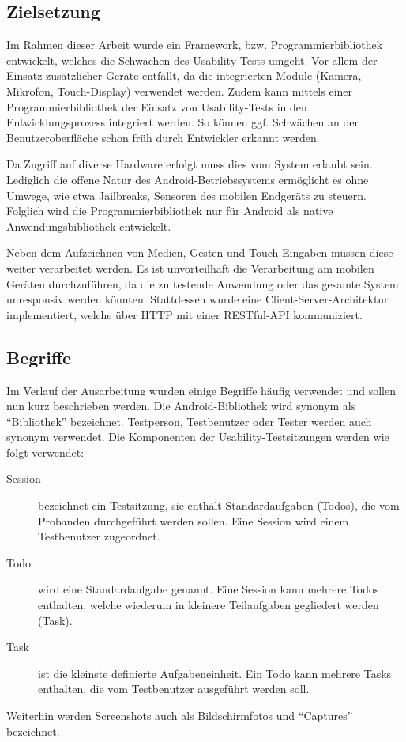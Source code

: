 \subsection{Zielsetzung \label{sec: zielsetzung}}

Im Rahmen dieser Arbeit wurde ein Framework, bzw. Programmierbibliothek entwickelt, welches die Schwächen des Usability-Tests umgeht. 
Vor allem der Einsatz zusätzlicher Geräte entfällt, da die integrierten Module (Kamera, Mikrofon, Touch-Display) verwendet werden. 
Zudem kann mittels einer Programmierbibliothek der Einsatz von Usability-Tests in den Entwicklungsprozess integriert werden. 
So können ggf. Schwächen an der Benutzeroberfläche schon früh durch Entwickler erkannt werden.

Da Zugriff auf diverse Hardware erfolgt muss dies vom System erlaubt sein. 
Lediglich die offene Natur des Android-Betriebssystems ermöglicht es ohne Umwege, wie etwa Jailbreaks, Sensoren des mobilen Endgeräts zu steuern. 
Folglich wird die Programmierbibliothek nur für Android als native Anwendungsbibliothek entwickelt. 

Neben dem Aufzeichnen von Medien, Gesten und Touch-Eingaben müssen diese weiter verarbeitet werden. 
Es ist unvorteilhaft die Verarbeitung am mobilen Geräten durchzuführen, da die zu testende Anwendung oder das gesamte System unresponsiv werden könnten. 
Stattdessen wurde eine Client-Server-Architektur implementiert, welche über \ac{HTTP} mit einer RESTful-API kommuniziert. 

\subsection{Begriffe}
Im Verlauf der Ausarbeitung wurden einige Begriffe häufig verwendet und sollen nun kurz beschrieben werden.
Die Android-Bibliothek wird synonym als \enquote{Bibliothek} bezeichnet.
Testperson, Testbenutzer oder Tester werden auch synonym verwendet.
Die Komponenten der Usability-Testsitzungen werden wie folgt verwendet:
\begin{description}
	\item[Session] bezeichnet ein Testsitzung, sie enthält Standardaufgaben (Todos), die vom Probanden durchgeführt werden sollen. Eine Session wird einem Testbenutzer zugeordnet.
	\item[Todo] wird eine Standardaufgabe genannt. Eine Session kann mehrere Todos enthalten, welche wiederum in kleinere Teilaufgaben gegliedert werden (Task).
	\item[Task] ist die kleinste definierte Aufgabeneinheit. Ein Todo kann mehrere Tasks enthalten, die vom Testbenutzer ausgeführt werden soll.
\end{description}
Weiterhin werden Screenshots auch als Bildschirmfotos und \enquote{Captures} bezeichnet. 
